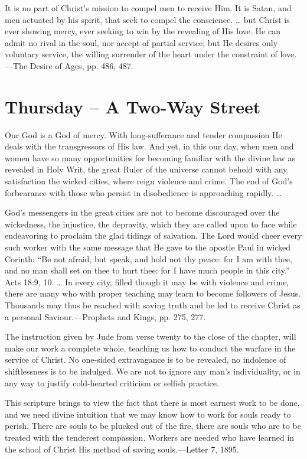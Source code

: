 \documentclass[a4paper, 10pt, twoside, headings=small]{scrartcl}
\begin{document}
\begin{multicols}{2}
It is no part of Christ’s mission to compel men to receive Him. It is Satan, and men actuated by his spirit, that seek to compel the conscience. … but Christ is ever showing mercy, ever seeking to win by the revealing of His love. He can admit no rival in the soul, nor accept of partial service; but He desires only voluntary service, the willing surrender of the heart under the constraint of love.—The Desire of Ages, pp. 486, 487.

\section*{Thursday – A Two-Way Street}

Our God is a God of mercy. With long-sufferance and tender compassion He deals with the transgressors of His law. And yet, in this our day, when men and women have so many opportunities for becoming familiar with the divine law as revealed in Holy Writ, the great Ruler of the universe cannot behold with any satisfaction the wicked cities, where reign violence and crime. The end of God’s forbearance with those who persist in disobedience is approaching rapidly. …

God’s messengers in the great cities are not to become discouraged over the wickedness, the injustice, the depravity, which they are called upon to face while endeavoring to proclaim the glad tidings of salvation. The Lord would cheer every such worker with the same message that He gave to the apostle Paul in wicked Corinth: “Be not afraid, but speak, and hold not thy peace: for I am with thee, and no man shall set on thee to hurt thee: for I have much people in this city.” Acts 18:9, 10. … In every city, filled though it may be with violence and crime, there are many who with proper teaching may learn to become followers of Jesus. Thousands may thus be reached with saving truth and be led to receive Christ as a personal Saviour.—Prophets and Kings, pp. 275, 277.

The instruction given by Jude from verse twenty to the close of the chapter, will make our work a complete whole, teaching us how to conduct the warfare in the service of Christ. No one-sided extravagance is to be revealed, no indolence of shiftlessness is to be indulged. We are not to ignore any man’s individuality, or in any way to justify cold-hearted criticism or selfish practice.

This scripture brings to view the fact that there is most earnest work to be done, and we need divine intuition that we may know how to work for souls ready to perish. There are souls to be plucked out of the fire, there are souls who are to be treated with the tenderest compassion. Workers are needed who have learned in the school of Christ His method of saving souls.—Letter 7, 1895.


\end{multicols}
\end{document}
